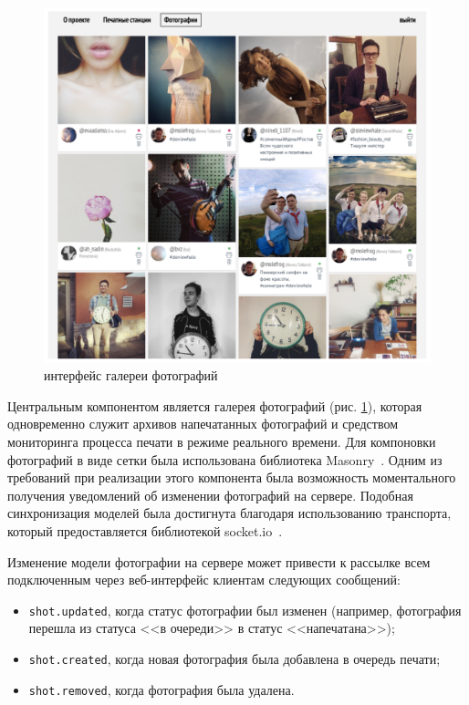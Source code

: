 \documentclass[a4paper,14pt,href,draft]{article}
\begin{document}
\begin{figure}[t!]
\begin{center}
  \includegraphics[scale=0.53]{grid-interface.pdf}
    \caption{интерфейс галереи фотографий}
    \label{fig:GridInterface}
\end{center}
\end{figure}

Центральным компонентом является галерея фотографий (рис. \ref{fig:GridInterface}), которая одновременно служит
архивов напечатанных фотографий и средством мониторинга процесса печати в режиме реального времени. Для компоновки
фотографий в виде сетки была использована библиотека Masonry~\cite{Masonry}. Одним из требований при реализации
этого компонента была возможность моментального получения уведомлений об изменении фотографий на сервере.
Подобная синхронизация моделей была достигнута благодаря использованию транспорта, который предоставляется библиотекой
socket.io~\cite{SocketIO}.

Изменение модели фотографии на сервере может привести к рассылке всем подключенным через веб-интерфейс клиентам
следующих сообщений:
\begin{itemize}
  \item \texttt{shot.updated}, когда статус фотографии был изменен (например, фотография перешла из статуса <<в очереди>>
  в статус <<напечатана>>);
  \item \texttt{shot.created}, когда новая фотография была добавлена в очередь печати;
  \item \texttt{shot.removed}, когда фотография была удалена.
\end{itemize}
\end{document}
